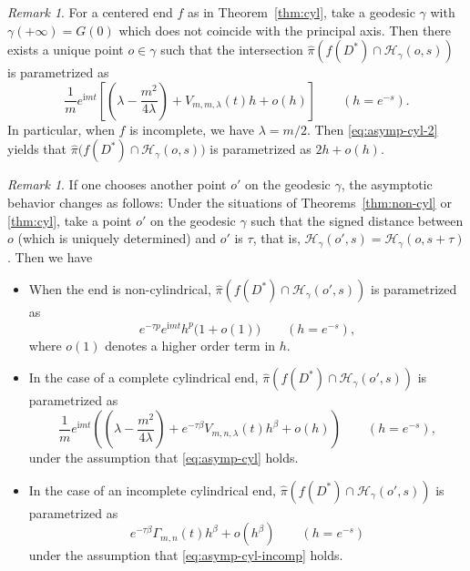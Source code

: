\documentclass[a4paper]{amsart}
\theoremstyle{plain}
\theoremstyle{remark}
\newtheorem{remark}[theorem]{Remark}
\numberwithin{equation}{section}
\begin{document}
\begin{remark}\label{rem:cyl-non-principal}
 For a centered end $f$ as in Theorem~\ref{thm:cyl},
 take a geodesic $\gamma$ with $\gamma(+\infty)=G(0)$
 which does not coincide with the principal axis.
 Then there exists a unique point $o\in\gamma$ such that
 the intersection $\hat \pi(f(D^*)\cap {\mathcal{H}}_{\gamma}(o,s))$
 is parametrized as
 \begin{equation}\label{eq:asymp-cyl-2}
  \frac{1}{m}e^{{\mathrm{i}} m t}
   \left[
    \left(\lambda-\frac{m^2}{4\lambda}\right)
    +
    V_{m,m,\lambda}(t)h
    +o(h)
   \right]\qquad (h=e^{-s}).
 \end{equation}
 In particular, when $f$ is incomplete, we have
 $\lambda=m/2$. Then \eqref{eq:asymp-cyl-2} yields that
 $\hat\pi\bigl(f(D^*)\cap{\mathcal{H}}_{\gamma}(o,s)\bigr)$ is
 parametrized as $2 h + o (h)$.
\end{remark}
\begin{remark}\label{rem:basepoint}
 If one chooses another point $o'$ on the geodesic $\gamma$, 
 the asymptotic behavior changes as follows:
 Under the situations of Theorems~\ref{thm:non-cyl} or \ref{thm:cyl},
 take a point $o'$ on the geodesic $\gamma$ such that
 the signed distance between $o$ (which is uniquely determined)
 and $o'$ is $\tau$,
 that is, ${\mathcal{H}}_{\gamma}(o',s)={\mathcal{H}}_{\gamma}(o,s+\tau)$.
 Then we have 
 \begin{itemize}
  \item When the end is non-cylindrical, 
	$\hat \pi(f(D^*)\cap {\mathcal{H}}_{\gamma}(o',s))$
	is parametrized as
	\[
	     e^{-\tau p} e^{{\mathrm{i}} m t}h^p\bigl(1+o(1)\bigr)
	     \qquad 
	     (h=e^{-s}),
	\]
	where $o(1)$ denotes a higher order term in $h$.
  \item In the case of a complete cylindrical end,
	$\hat \pi(f(D^*)\cap {\mathcal{H}}_{\gamma}(o',s))$
	is pa\-ramet\-rized as
	\[
	    \frac{1}{m}e^{{\mathrm{i}} m t}
	    \left(
	    \left(\lambda-\frac{m^2}{4\lambda}\right)
	    +
	    e^{-\tau\beta}V_{m,n,\lambda}(t)h^{\beta}
	    +o(h)
	    \right)\qquad (h=e^{-s}),
	\]
	under the assumption that \eqref{eq:asymp-cyl} holds.
  \item In the case of an incomplete cylindrical end,
	$\hat \pi(f(D^*)\cap {\mathcal{H}}_{\gamma}(o',s))$
	is pa\-ramet\-rized as
	\[
	      e^{-\tau\beta}{\varGamma}_{m,n}(t)h^{\beta}+o(h^\beta)\qquad 
	      (h=e^{-s})
	\]
	under the assumption that \eqref{eq:asymp-cyl-incomp} holds.
 \end{itemize}
\end{remark}
\end{document}
